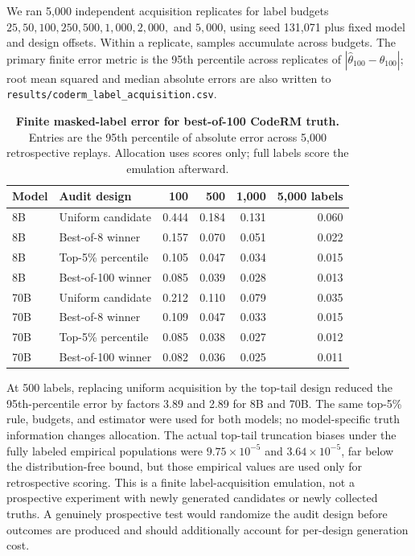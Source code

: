 We ran 5,000 independent acquisition replicates for label budgets $25,50,100,250,500,1{,}000,2{,}000,$ and $5{,}000$, using seed 131,071 plus fixed model and design offsets. Within a replicate, samples accumulate across budgets. The primary finite error metric is the 95th percentile across replicates of $|\widehat\theta_{100}-\theta_{100}|$; root mean squared and median absolute errors are also written to \texttt{results/coderm\_label\_acquisition.csv}.

\begin{table}[h]
\centering
\caption{\textbf{Finite masked-label error for best-of-100 CodeRM truth.} Entries are the 95th percentile of absolute error across 5,000 retrospective replays. Allocation uses scores only; full labels score the emulation afterward.}
\label{si:tab:finite-label-acquisition}
\begin{tabular}{llrrrr}
\toprule
Model & Audit design & 100 & 500 & 1,000 & 5,000 labels \\
\midrule
8B & Uniform candidate & 0.444 & 0.184 & 0.131 & 0.060 \\
8B & Best-of-8 winner & 0.157 & 0.070 & 0.051 & 0.022 \\
8B & Top-5\% percentile & 0.105 & 0.047 & 0.034 & 0.015 \\
8B & Best-of-100 winner & 0.085 & 0.039 & 0.028 & 0.013 \\
70B & Uniform candidate & 0.212 & 0.110 & 0.079 & 0.035 \\
70B & Best-of-8 winner & 0.109 & 0.047 & 0.033 & 0.015 \\
70B & Top-5\% percentile & 0.085 & 0.038 & 0.027 & 0.012 \\
70B & Best-of-100 winner & 0.082 & 0.036 & 0.025 & 0.011 \\
\bottomrule
\end{tabular}
\end{table}

At 500 labels, replacing uniform acquisition by the top-tail design reduced the 95th-percentile error by factors 3.89 and 2.89 for 8B and 70B. The same top-5\% rule, budgets, and estimator were used for both models; no model-specific truth information changes allocation. The actual top-tail truncation biases under the fully labeled empirical populations were $9.75\times10^{-5}$ and $3.64\times10^{-5}$, far below the distribution-free bound, but those empirical values are used only for retrospective scoring. This is a finite label-acquisition emulation, not a prospective experiment with newly generated candidates or newly collected truths. A genuinely prospective test would randomize the audit design before outcomes are produced and should additionally account for per-design generation cost.

